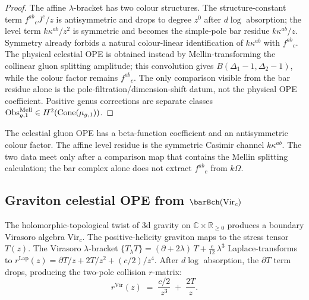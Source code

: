 \begin{proof}
The affine $\lambda$-bracket has two colour structures. The structure-constant term
\(f^{ab}{}_{c}J^c/z\) is antisymmetric and drops to degree \(z^0\) after $d\log$
absorption; the level term \(k\kappa^{ab}/z^2\) is symmetric and becomes the simple-pole bar
residue \(k\kappa^{ab}/z\). Symmetry already forbids a natural colour-linear identification
of \(k\kappa^{ab}\) with \(f^{ab}{}_{c}\). The physical celestial OPE is obtained instead by
Mellin-transforming the collinear gluon splitting amplitude; this convolution gives
\(B(\Delta_1-1,\Delta_2-1)\), while the colour factor remains \(f^{ab}{}_{c}\). The only
comparison visible from the bar residue alone is the pole-filtration/dimension-shift datum,
not the physical OPE coefficient. Positive genus corrections are separate classes
\(\operatorname{Obs}^{\mathrm{Mell}}_{g,1}\in H^2(\operatorname{Cone}(\mu_{g,1}))\).
\end{proof}

\begin{remark}
\label{rem:ch-core-fft}
The celestial gluon OPE has a beta-function coefficient and an antisymmetric colour factor.
The affine level residue is the symmetric Casimir channel \(k\kappa^{ab}\). The two data
meet only after a comparison map that contains the Mellin splitting calculation; the bar
complex alone does not extract \(f^{ab}{}_{c}\) from \(k\Omega\).
\end{remark}


\subsection{Graviton celestial OPE from $\barBch(\mathrm{Vir}_c)$}
\label{subsec:ch-core-graviton-celestial-ope}

The holomorphic-topological twist of $3$d gravity on $\mathbb{C} \times \mathbb{R}_{\ge 0}$ produces a boundary Virasoro algebra $\mathrm{Vir}_c$. The positive-helicity graviton maps to the stress tensor~$T(z)$. The Virasoro $\lambda$-bracket $\{T{}_\lambda T\} = (\partial + 2\lambda)\,T + \frac{c}{12}\,\lambda^3$ Laplace-transforms to $r^{\mathrm{Lap}}(z) = \partial T/z + 2T/z^2 + (c/2)/z^4$. After $d\log$ absorption, the $\partial T$ term drops, producing the two-pole collision $r$-matrix:
\[
r^{\mathrm{Vir}}(z) \;=\; \frac{c/2}{z^3} \;+\; \frac{2T}{z}.
\]

